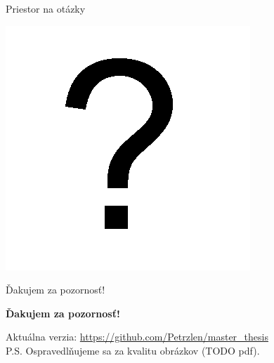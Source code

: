 \documentclass[xcolor=dvipsnames]{beamer}
\begin{document}
\begin{frame}{Priestor na otázky}
  \begin{center}
  \includegraphics[scale=0.75]{img/question.png}
  \end{center}
\end{frame}

\begin{frame}{Ďakujem za pozornosť!}
  \begin{center}
{\bf Ďakujem za pozornosť!} 
  \end{center}
  
  \vspace{2cm}
  
  \begin{center}
  Aktuálna verzia: \url{https://github.com/Petrzlen/master_thesis} \\
  \vspace{5mm} 
  \small{P.S. Ospravedlňujeme sa za kvalitu obrázkov (TODO pdf).}
  \end{center}
\end{frame}
\end{document}
